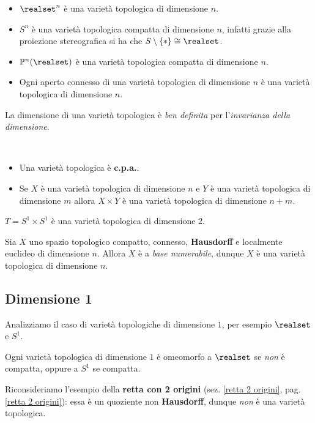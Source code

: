\begin{examples}
	\begin{itemize}
		\item $\realset^n$ è una varietà topologica di dimensione $n$.
		\item $S^n$ è una varietà topologica compatta di dimensione $n$, infatti grazie alla proiezione stereografica si ha che $S\setminus\{*\}\cong \realset$.
		\item $\mathbb{P}^n(\realset)$ è una varietà topologica compatta di dimensione $n$.
		\item Ogni aperto connesso di una varietà topologica di dimensione $n$ è una varietà topologica di dimensione $n$.
	\end{itemize}
\vspace{-3mm}
\end{examples}
\begin{observe}
	La dimensione di una varietà topologica è \textit{ben definita} per l'\textit{invarianza della dimensione}.
\end{observe}
\begin{observes}~{}
	\begin{itemize}
		\item Una varietà topologica è \textbf{c.p.a.}.
		\item Se $X$ è una varietà topologica di dimensione $n$ e $Y$ è una varietà topologica di dimensione $m$ allora $X\times Y$ è una varietà topologica di dimensione $n+m$.
	\end{itemize}
\end{observes}
\begin{example}
	$T=S^1\times S^1$ è una varietà topologica di dimensione $2$.
\end{example}

\begin{theorema}
	Sia $X$ uno spazio topologico compatto, connesso, \textbf{Hausdorff} e localmente euclideo di dimensione $n$. Allora $X$ è a \textit{base numerabile}, dunque $X$ è una varietà topologica di dimensione $n$.
\end{theorema}
 
\subsection{Dimensione 1}
Analizziamo il caso di varietà topologiche di dimensione $1$, per esempio $\realset$ e $S^1$.
\begin{theorema}
	Ogni varietà topologica di dimensione $1$ è omeomorfo a $\realset$ se \textit{non} è compatta, oppure a $S^1$ se compatta.
\end{theorema}
\begin{example} 
Riconsideriamo l'esempio della \textbf{retta con 2 origini} (sez. \ref{retta 2 origini}, pag. \ref{retta 2 origini}): essa è un quoziente non \textbf{Hausdorff}, dunque \textit{non} è una varietà topologica.
\end{example}
